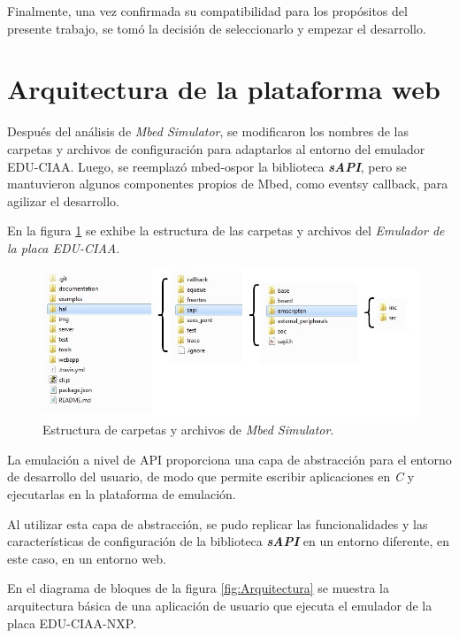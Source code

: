 Finalmente, una vez confirmada su compatibilidad para los propósitos del presente trabajo, se tomó la decisión de seleccionarlo y empezar el desarrollo.


\section{Arquitectura de la plataforma web}

Después del análisis de \textit{Mbed Simulator}, se modificaron los nombres de las carpetas y archivos de configuración para adaptarlos al entorno del emulador EDU-CIAA. Luego, se reemplazó \textquotedbl mbed-os\textquotedbl por la biblioteca \textit{\textbf{sAPI}}, pero se mantuvieron algunos componentes propios de Mbed, como \textquotedbl events\textquotedbl y \textquotedbl callback\textquotedbl, para agilizar el desarrollo.
  
En la figura \ref{fig:estructuraCiaa} se exhibe la estructura de las carpetas y archivos del  \textit{Emulador de la placa EDU-CIAA}.

\begin{figure}[ht]
	\centering
	\includegraphics[scale=.50]{./Figures/estructuraCiaa.jpg}
	\caption{Estructura de carpetas y archivos de \textit{Mbed Simulator}.}
	\label{fig:estructuraCiaa}
\end{figure}
 

La emulación a nivel de API proporciona una capa de abstracción para el entorno de desarrollo del usuario, de modo que permite escribir aplicaciones en \textit{C} y ejecutarlas en la plataforma de emulación. 

Al utilizar esta capa de abstracción, se pudo replicar las funcionalidades y las características de configuración de la biblioteca \textit{\textbf{sAPI}} en un entorno diferente, en este caso, en un entorno web.


En el diagrama de bloques de la figura \ref{fig:Arquitectura} se muestra la arquitectura básica de una aplicación de usuario que ejecuta el emulador de la placa EDU-CIAA-NXP.



